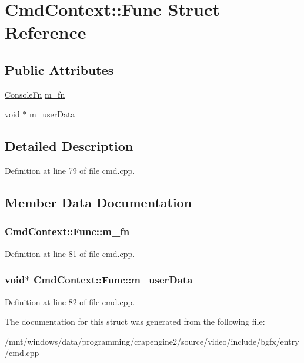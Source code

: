 \hypertarget{struct_cmd_context_1_1_func}{\section{Cmd\+Context\+:\+:Func Struct Reference}
\label{struct_cmd_context_1_1_func}
}
\subsection*{Public Attributes}
\begin{DoxyCompactItemize}
\item 
\hyperlink{cmd_8h_aaab80fbdebf67debb124e449ae502c99}{Console\+Fn} \hyperlink{struct_cmd_context_1_1_func_ae0af5e12d79c79aec503479c18d6484b}{m\+\_\+fn}
\item 
void $\ast$ \hyperlink{struct_cmd_context_1_1_func_a2b71a0aeda23837aada264268ec04472}{m\+\_\+user\+Data}
\end{DoxyCompactItemize}


\subsection{Detailed Description}


Definition at line 79 of file cmd.\+cpp.



\subsection{Member Data Documentation}
\hypertarget{struct_cmd_context_1_1_func_ae0af5e12d79c79aec503479c18d6484b}{
\subsubsection[{m\+\_\+fn}]{ Cmd\+Context\+::\+Func\+::m\+\_\+fn}}\label{struct_cmd_context_1_1_func_ae0af5e12d79c79aec503479c18d6484b}


Definition at line 81 of file cmd.\+cpp.

\hypertarget{struct_cmd_context_1_1_func_a2b71a0aeda23837aada264268ec04472}{
\subsubsection[{m\+\_\+user\+Data}]{\setlength{\rightskip}{0pt plus 5cm}void$\ast$ Cmd\+Context\+::\+Func\+::m\+\_\+user\+Data}}\label{struct_cmd_context_1_1_func_a2b71a0aeda23837aada264268ec04472}


Definition at line 82 of file cmd.\+cpp.



The documentation for this struct was generated from the following file\+:\begin{DoxyCompactItemize}
\item 
/mnt/windows/data/programming/crapengine2/source/video/include/bgfx/entry/\hyperlink{cmd_8cpp}{cmd.\+cpp}\end{DoxyCompactItemize}
